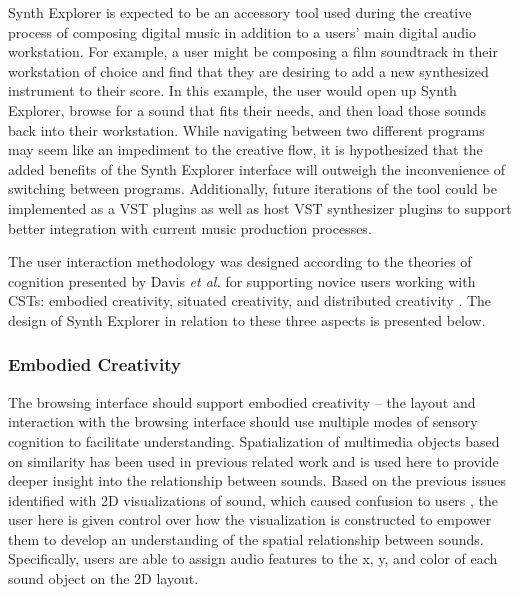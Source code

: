 Synth Explorer is expected to be an accessory tool used during the creative process of composing digital music in addition to a users' main digital audio workstation. For example, a user might be composing a film soundtrack in their workstation of choice and find that they are desiring to add a new synthesized instrument to their score. In this example, the user would open up Synth Explorer, browse for a sound that fits their needs, and then load those sounds back into their workstation. While navigating between two different programs may seem like an impediment to the creative flow, it is hypothesized that the added benefits of the Synth Explorer interface will outweigh the inconvenience of switching between programs. Additionally, future iterations of the tool could be implemented as a VST plugins as well as host VST synthesizer plugins to support better integration with current music production processes.

The user interaction methodology was designed according to the theories of cognition presented by Davis \textit{et al.} for supporting novice users working with CSTs: embodied creativity, situated creativity, and distributed creativity \cite{davis2013toward}. The design of Synth Explorer in relation to these three aspects is presented below.

\subsubsection{Embodied Creativity}
The browsing interface should support embodied creativity -- the layout and interaction with the browsing interface should use multiple modes of sensory cognition to facilitate understanding. Spatialization of multimedia objects based on similarity has been used in previous related work \cite{10.1145/3325480.3325506} and is used here to provide deeper insight into the relationship between sounds. Based on the previous issues identified with 2D visualizations of sound, which caused confusion to users \cite{turquois2016exploring}, the user here is given control over how the visualization is constructed to empower them to develop an understanding of the spatial relationship between sounds. Specifically, users are able to assign audio features to the x, y, and color of each sound object on the 2D layout.

